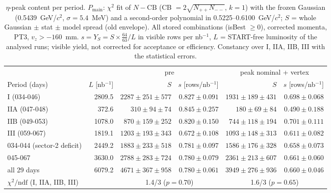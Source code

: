 \begin{table}[H]
\centering\small
\setlength{\tabcolsep}{4pt}
\caption{$\eta$-peak content per period. $P_\mathrm{main}$: $\chi^2$ fit of $N-\mathrm{CB}$ (CB $=2\sqrt{N_{++}N_{--}}$, $k=1$) with the frozen Gaussian (0.5439~GeV/$c^2$, $\sigma=5.4$~MeV) and a second-order polynomial in 0.5225--0.6100~GeV/$c^2$; $S$ = whole Gaussian $\pm$ stat $\pm$ model spread (old envelope). All stored combinations (isBest $\geq 0$), corrected momenta, PT3, $v_z>-160$~mm. $s=Y_S=S\times\frac{64}{63}/L$ in visible rows per nb$^{-1}$, $L$ = START-free luminosity of the analysed runs; visible yield, not corrected for acceptance or efficiency. Constancy over I, IIA, IIB, III with the statistical errors.}
\label{tab:smp_peak_periods}
\begin{tabular}{lr rr rr}
\toprule
 & & \multicolumn{2}{c}{pre} & \multicolumn{2}{c}{peak nominal + vertex} \\
Period (days) & $L$ [nb$^{-1}$] & $S$ & $s$ [rows/nb$^{-1}$] & $S$ & $s$ [rows/nb$^{-1}$] \\
\midrule
I (034-046) & 2809.5 & $2287\pm251\pm577$ & $0.827\pm0.091$ & $1931\pm189\pm431$ & $0.698\pm0.068$ \\
IIA (047-048) & 372.6 & $310\pm94\pm74$ & $0.845\pm0.257$ & $180\pm69\pm84$ & $0.490\pm0.188$ \\
IIB (049-053) & 1078.0 & $870\pm159\pm252$ & $0.820\pm0.150$ & $744\pm118\pm194$ & $0.701\pm0.111$ \\
III (059-067) & 1819.1 & $1203\pm193\pm343$ & $0.672\pm0.108$ & $1093\pm148\pm313$ & $0.611\pm0.082$ \\
\midrule
034-044 (sector-2 deficit) & 2449.2 & $1883\pm233\pm518$ & $0.781\pm0.097$ & $1586\pm176\pm328$ & $0.658\pm0.073$ \\
045-067 & 3630.0 & $2788\pm283\pm724$ & $0.780\pm0.079$ & $2361\pm213\pm607$ & $0.661\pm0.060$ \\
\midrule
all 29 days & 6079.2 & $4671\pm367\pm958$ & $0.780\pm0.061$ & $3949\pm276\pm936$ & $0.660\pm0.046$ \\
\midrule
$\chi^2/\mathrm{ndf}$ (I, IIA, IIB, III) &  & \multicolumn{2}{c}{1.4/3 ($p=0.70$)} & \multicolumn{2}{c}{1.6/3 ($p=0.65$)} \\
\bottomrule
\end{tabular}
\end{table}
